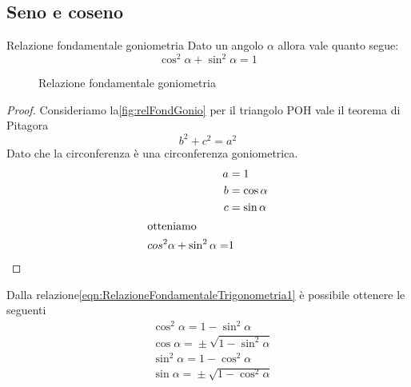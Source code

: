 \subsection{Seno e coseno}
\label{sec:RelazioniFondamentaliSenoCoseno}
\begin{teoremat}{Relazione fondamentale goniometria}{}
Dato un angolo $\alpha$ allora vale quanto segue:
\begin{equation*}
\cos^2\alpha+\sin^2\alpha=1\label{eqn:RelazioneFondamentaleTrigonometria1}
\end{equation*}
\end{teoremat}
\begin{figure}
	\centering
	
\caption{Relazione fondamentale goniometria}\label{fig:relFondGonio}
\end{figure}
\begin{proof}
	Consideriamo la\nobs\vref{fig:relFondGonio} per il triangolo POH vale il teorema di Pitagora \[b^2+c^2=a^2\] Dato che la circonferenza è una circonferenza goniometrica.
	\begin{align*}
	a&=1\\
	b&=\cos\alpha\\
	c&=\sin\alpha\\
	\intertext{otteniamo}
	cos^2\alpha+\sin^2\alpha=&1 \\
	\end{align*}
\end{proof}
Dalla relazione\nobs\vref{eqn:RelazioneFondamentaleTrigonometria1} è possibile ottenere le seguenti
\begin{align*}
&\cos^{2}\alpha={}1-\sin^{2}\alpha\\
&\cos\alpha={}\pm\sqrt{1-\sin^{2}\alpha}\\
&\sin^{2}\alpha={}1-\cos^{2}\alpha \\
&\sin\alpha={}\pm\sqrt{1-\cos^{2}\alpha}
\end{align*}

